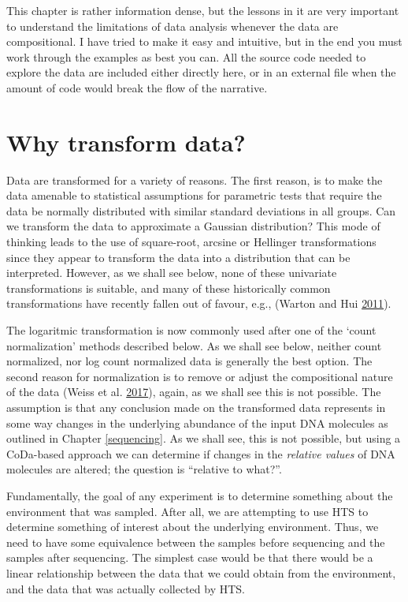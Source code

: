\documentclass[onecolumn]{book}
\theoremstyle{definition}
\theoremstyle{definition}
\theoremstyle{definition}
\theoremstyle{remark}
\begin{document}
This chapter is rather information dense, but the lessons in it are very
important to understand the limitations of data analysis whenever the
data are compositional. I have tried to make it easy and intuitive, but
in the end you must work through the examples as best you can. All the
source code needed to explore the data are included either directly
here, or in an external file when the amount of code would break the
flow of the narrative.

\hypertarget{why-transform-data}{%
\section{Why transform data?}\label{why-transform-data}}

Data are transformed for a variety of reasons. The first reason, is to
make the data amenable to statistical assumptions for parametric tests
that require the data be normally distributed with similar standard
deviations in all groups. Can we transform the data to approximate a
Gaussian distribution? This mode of thinking leads to the use of
square-root, arcsine or Hellinger transformations since they appear to
transform the data into a distribution that can be interpreted. However,
as we shall see below, none of these univariate transformations is
suitable, and many of these historically common transformations have
recently fallen out of favour, e.g., (Warton and Hui
\protect\hyperlink{ref-Warton:2011aa}{2011}).

The logaritmic transformation is now commonly used after one of the
`count normalization' methods described below. As we shall see below,
neither count normalized, nor log count normalized data is generally the
best option. The second reason for normalization is to remove or adjust
the compositional nature of the data (Weiss et al.
\protect\hyperlink{ref-Weiss:2017aa}{2017}), again, as we shall see this
is not possible. The assumption is that any conclusion made on the
transformed data represents in some way changes in the underlying
abundance of the input DNA molecules as outlined in Chapter
\ref{sequencing}. As we shall see, this is not possible, but using a
CoDa-based approach we can determine if changes in the
\emph{relative values} of DNA molecules are altered; the question is
``relative to what?''.

Fundamentally, the goal of any experiment is to determine something
about the environment that was sampled. After all, we are attempting to
use HTS to determine something of interest about the underlying
environment. Thus, we need to have some equivalence between the samples
before sequencing and the samples after sequencing. The simplest case
would be that there would be a linear relationship between the data that
we could obtain from the environment, and the data that was actually
collected by HTS.
\end{document}
